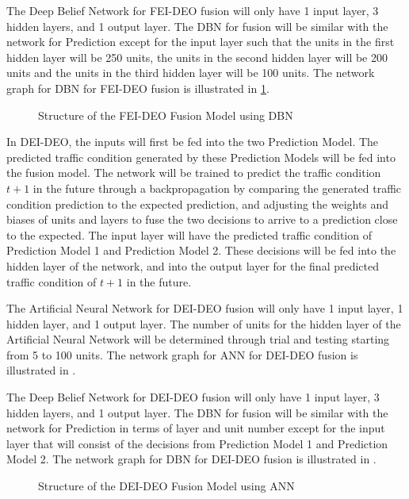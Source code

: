 The Deep Belief Network for FEI-DEO fusion will only have 1 input layer, 3 hidden layers, and 1 output layer. The DBN for fusion will be similar with the network for Prediction except for the input layer such that the units in the first hidden layer will be 250 units, the units in the second hidden layer will be 200 units and the units in the third hidden layer will be 100 units. The network graph for DBN for FEI-DEO fusion is illustrated in \ref{fig:feideo_dbn}. 

\begin{figure}[h]
	\centering
	\captionsetup{justification=centering}
	\caption{Structure of the FEI-DEO Fusion Model using DBN}
	\label{fig:feideo_dbn}
\end{figure}

In DEI-DEO, the inputs will first be fed into the two Prediction Model. The predicted traffic condition generated by these Prediction Models will be fed into the fusion model. The network will be trained to predict the traffic condition $t+1$ in the future through a backpropagation by comparing the generated traffic condition prediction to the expected prediction, and adjusting the weights and biases of units and layers to fuse the two decisions to arrive to a prediction close to the expected. The input layer will have the predicted traffic condition of Prediction Model 1 and Prediction Model 2. These decisions will be fed into the hidden layer of the network, and into the output layer for the final predicted traffic condition of $t+1$ in the future. 

The Artificial Neural Network for DEI-DEO fusion will only have 1 input layer, 1 hidden layer, and 1 output layer. The number of units for the hidden layer of the Artificial Neural Network will be determined through trial and testing starting from 5 to 100 units. The network graph for ANN for DEI-DEO fusion is illustrated in . 

The Deep Belief Network for DEI-DEO fusion will only have 1 input layer, 3 hidden layers, and 1 output layer. The DBN for fusion will be similar with the network for Prediction in terms of layer and unit number except for the input layer that will consist of the decisions from Prediction Model 1 and Prediction Model 2. The network graph for DBN for DEI-DEO fusion is illustrated in .

\begin{figure}[h]
	\centering
	\captionsetup{justification=centering}
	\caption{Structure of the DEI-DEO Fusion Model using ANN}
	\label{fig:deideo_ann}
\end{figure}

